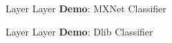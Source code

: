 
\begin{slide}{Layer Layer}
  \huge
  \textbf{Demo}: MXNet Classifier
\end{slide}

\begin{slide}{Layer Layer}
  \huge
  \textbf{Demo}: Dlib Classifier
\end{slide}
